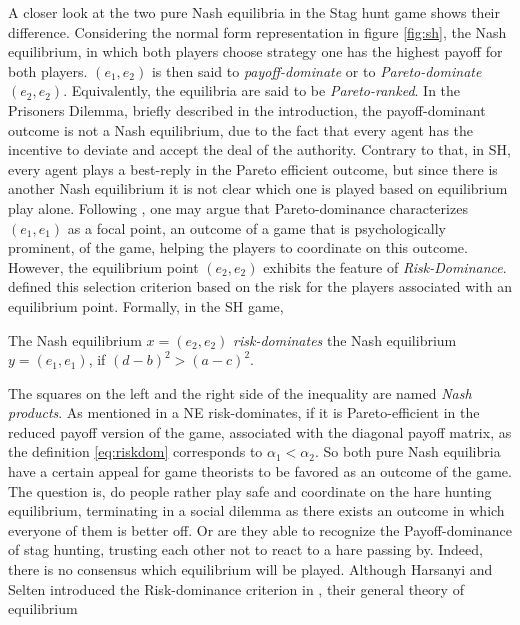 A closer look at the two pure Nash equilibria in the Stag hunt game 
shows their difference. Considering the normal form representation in figure 
\ref{fig:sh}, the Nash equilibrium, in which both players choose strategy one 
has the highest payoff
for both players. $(e_1,e_2)$ is then said to 
\textit{payoff-dominate} or to \textit{Pareto-dominate} 
$(e_2,e_2)$. Equivalently, the equilibria are said to be
\textit{Pareto-ranked}.
In the Prisoners Dilemma, briefly described in the introduction, 
the payoff-dominant outcome is not a 
Nash equilibrium, due to the fact that every agent has the incentive to 
deviate and accept the deal of the authority.
Contrary to that, in SH, every agent plays a best-reply 
in the Pareto efficient outcome, but since there is another Nash equilibrium 
it is not clear which one is played based on equilibrium play alone. 
Following \textcite[57]{schelling_strategy_1960}, one may argue that 
Pareto-dominance characterizes $(e_1,e_1)$ as a focal point, 
an outcome of a game that is psychologically prominent, of 
the game, helping the players to coordinate on this outcome.
However, the equilibrium point $(e_2,e_2)$ exhibits the feature 
of \textit{Risk-Dominance}. 
\textcite{harsanyi_general_1988} defined this selection criterion 
based on the
risk for the players associated with an equilibrium point. Formally, in the
SH game, 
\begin{mydef}
The Nash equilibrium $x=(e_2,e_2)$ \textit{risk-dominates} 
the Nash equilibrium $y=(e_1,e_1)$, if $(d-b)^2 > (a-c)^2$.
         \label{eq:riskdom}
 \end{mydef}
The squares on the left and the right side of the inequality are named
\textit{Nash products}.
As mentioned in \textcite{weibull_evolutionary_1997} a NE risk-dominates, 
if it is Pareto-efficient  in the reduced payoff version of the game, 
associated with the diagonal
payoff matrix, as the definition \eqref{eq:riskdom} 
corresponds to $\alpha_1 < \alpha_2$.
So both pure Nash equilibria have a certain appeal for game theorists to be
favored as an outcome of the game. The question is, do people rather play
safe and coordinate on the hare hunting equilibrium, terminating in a social
dilemma as there exists an outcome in which everyone of them is better off.
Or are they able to recognize the Payoff-dominance of stag hunting, 
trusting each other not to react to a hare passing by.
Indeed, there is no consensus which equilibrium will be played. 
Although Harsanyi and Selten introduced the Risk-dominance criterion in 
\textcite{harsanyi_general_1988}, their general theory of equilibrium 
